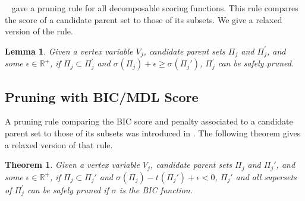 \documentclass[letterpaper]{article}
\newcommand{\vertex}[1]{V_{#1}}
\newcommand{\score}[2]{\sigma_{#1}({#2})}
\newcommand{\pen}[2]{t_{#1}({#2})}
\newtheorem{theorem}{Theorem}
\newtheorem{lemma}{Lemma}
\begin{document}


\citeauthor{TeyssierK05}~ gave a pruning rule for all decomposable scoring functions. This rule compares the score of a candidate parent set to those of its subsets. We give a relaxed version of the rule.


	\begin{lemma}
	Given a vertex variable $\vertex{j}$, candidate parent sets
	$\Pi_j$ and  $\Pi_j^{\prime}$, and some $\epsilon\in \mathbb{R}^+$,  if $\Pi_j \subset \Pi_j^{\prime}$ and $\score{}{\Pi_j} + \epsilon \geq \score{}{\Pi_j'}$,
	$\Pi_j^{\prime}$ can be safely pruned. \label{lem:scoreprune}
	\end{lemma}

\subsection{Pruning with BIC/MDL Score}


A pruning rule comparing the BIC score and penalty associated to a candidate parent set to those of its subsets was introduced in \cite{CamposJ11}. The following theorem gives a relaxed version of that rule.
\begin{theorem}
Given a vertex variable $\vertex{j}$,  candidate parent sets
	$\Pi_j$ and $\Pi_j'$, and some $\epsilon \in \mathbb{R}^+$,
	if $\Pi_j \subset \Pi_j'$ and $\score{}{\Pi_j} -  \pen{}{\Pi_j'} + \epsilon < 0$,
	$\Pi_j'$ and all supersets of $\Pi_j^{\prime}$ can be safely pruned  if $\sigma$ is the BIC function.
\end{theorem}
\end{document}

